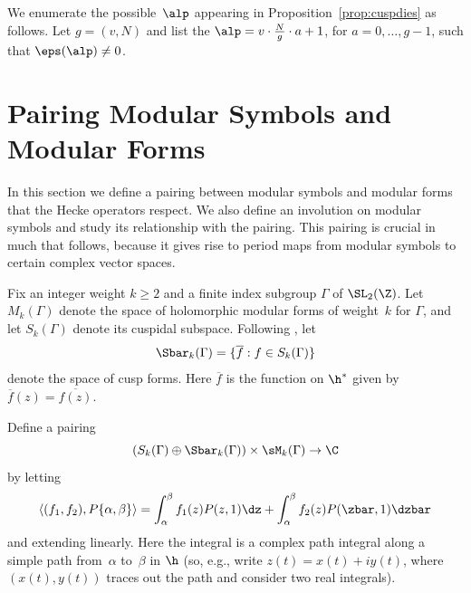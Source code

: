 We enumerate the possible~$\alp$ appearing 
in Proposition~\ref{prop:cuspdies} as follows. 
Let $g=(v,N)$ and list the
$\alp=v\cdot\frac{N}{g}\cdot{}a+1$, for $a=0,\ldots,g-1$,
such that $\eps(\alp)\neq 0$. 


\section{Pairing Modular Symbols and Modular Forms}%
\label{sec:pairing}%
In this section we define a pairing between modular symbols and
modular forms that the Hecke operators respect.  
We also define an involution on modular symbols and study
its relationship with the pairing.  This pairing is crucial in much
that follows, because it gives rise to period maps from modular
symbols to certain complex vector spaces.

Fix an integer weight $k\geq 2$ and a finite index subgroup
$\Gamma$ of $\SL_2(\Z)$.  Let $M_k(\Gamma)$ denote the space
of holomorphic modular forms of weight~$k$ for $\Gamma$,
and let $S_k(\Gamma)$ denote its cuspidal subspace.
Following \cite[\S1.5]{merel:1585}, let 
\begin{equation}\label{eqn:sbar}
 \Sbar_k(\Gamma) = \{\overline{f} : f \in S_k(\Gamma)\}
\end{equation}
denote the space of  cusp forms.  Here
$\overline{f}$ is the function on $\h^*$ given by
$\overline{f}(z) = \overline{f(z)}$.

Define a pairing
\begin{equation}\label{eqn:intpairing}
 (S_k(\Gamma) \oplus \Sbar_k(\Gamma)) 
   \times \sM_k(\Gamma) \to \C
 \end{equation}
 by letting
$$
  \langle (f_1, f_2), P\{\alpha,\beta\} \rangle 
   = \int_{\alpha}^{\beta} f_1(z) P(z,1)\dz +
    \int_{\alpha}^{\beta} f_2(z) P(\zbar,1) \dzbar
$$
and extending linearly.   Here the integral is a complex
path integral along a simple path from~$\alpha$ 
to~$\beta$  in $\h$ (so, e.g., write $z(t)=x(t) + iy(t)$,
where $(x(t),y(t))$ traces out the path and consider
two real integrals).

